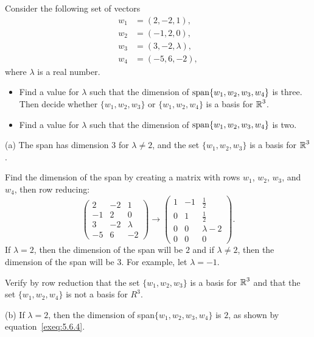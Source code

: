 \documentclass{ximera}
\begin{document}
\CEXER

\begin{exercise} \label{c5.6.4}
Consider the following set of vectors
\begin{align*}
w_1 &= (2, -2, 1), \\
w_2 &= (-1, 2, 0), \\
w_3 &= (3, -2, \lambda), \\
w_4 &= (-5, 6, -2),
\end{align*}
where $\lambda$ is a real number.
\begin{itemize}
\item[(a)] Find a value for $\lambda$ such that the
dimension of ${\rm span}\{w_1,w_2,w_3,w_4\}$ is three. Then decide
whether $\{w_1,w_2,w_3\}$ or $\{w_1,w_2,w_4\}$ is a basis for
$\mbox{$\Bbb{R}$}^3$.
\item[(b)] Find a value for $\lambda$ such that the
dimension of ${\rm span}\{w_1,w_2,w_3,w_4\}$ is two.
\end{itemize}

\begin{solution}

(a) \ans The span has dimension $3$ for $\lambda \neq 2$, and 
the set $\{w_1,w_2,w_3\}$ is a basis for $\mbox{$\Bbb{R}$}^3$.

\soln Find the dimension of the span by creating a matrix with rows
$w_1$, $w_2$, $w_3$, and $w_4$, then row reducing:
\begin{equation} \label{exeq:5.6.4}
\left(\begin{array}{rrr} 2 & -2 & 1 \\ -1 & 2 & 0 \\ 3 & -2 &
\lambda \\ -5 & 6 & -2 \end{array}\right) \longrightarrow
\left(\begin{array}{rrc} 1 & -1 & \frac{1}{2} \\ 0 & 1 & \frac{1}{2}
\\ 0 & 0 & \lambda - 2 \\ 0 & 0 & 0 \end{array}\right).
\end{equation}
If $\lambda = 2$, then the dimension of the span will
be $2$ and if $\lambda \neq 2$, then the dimension of the span
will be $3$.  For example, let $\lambda = -1$.

\para Verify by row reduction that the set $\{w_1,w_2,w_3\}$ is a basis
for $\mbox{$\Bbb{R}$}^3$ and that the set $\{w_1,w_2,w_4\}$ is not a basis for $R^3$. 

(b) If $\lambda = 2$, then the dimension of span$\{w_1,w_2,w_3,w_4\}$
is $2$, as shown by equation~\eqref{exeq:5.6.4}.



\end{solution}
\end{exercise}
\end{document}

